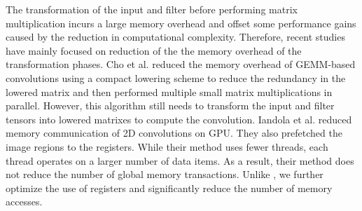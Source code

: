 The transformation of the input and filter before performing matrix multiplication incurs a large memory overhead and offset some
performance gains caused by the reduction in computational complexity. Therefore, recent studies have mainly focused on reduction of the
the memory overhead of the transformation phases. Cho et al. \cite{cho2017mec} reduced the memory overhead of GEMM-based convolutions using
a compact lowering scheme to reduce the redundancy in the lowered matrix and then performed multiple small matrix multiplications in
parallel. However, this algorithm still needs to transform the input and filter tensors into lowered matrixes to compute the convolution.
Iandola et al. \cite{Iandola2014Communication} reduced memory communication of 2D convolutions on GPU. They also prefetched the image
regions to the registers. While their method uses fewer threads, each thread operates on a larger number of data items. As a result, their
method does not reduce the number of global memory transactions. Unlike \cite{Iandola2014Communication}, we further optimize the use of
registers and significantly reduce the number of memory accesses.
